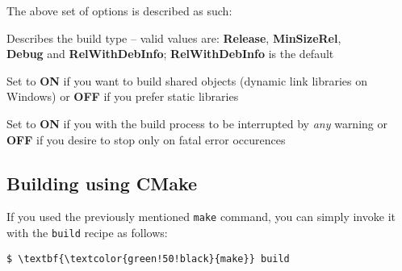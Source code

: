 The above set of options is described as such:
\begin{description}[style=nextline]
    \item[\texttt{-DCMAKE\textunderscore BUILD\textunderscore TYPE}] \hfill Describes the build type -- valid values are: \textbf{Release}, \textbf{MinSizeRel}, \\ \textbf{Debug} and \textbf{RelWithDebInfo}; \textbf{RelWithDebInfo} is the default
    \item[\texttt{-DBUILD\textunderscore SHARED\textunderscore LIBS}] \hfill Set to \textbf{ON} if you want to build shared objects (dynamic link libraries on Windows\texttrademark) or \textbf{OFF} if you prefer static libraries
    \item[\texttt{-DCLM\textunderscore WARNINGS\textunderscore AS\textunderscore ERRORS}] \hfill Set to \textbf{ON} if you with the build process to be interrupted by \emph{any} warning or \textbf{OFF} if you desire to stop only on fatal error occurences
\end{description}

\subsection*{Building using CMake}

If you used the previously mentioned \texttt{make} command, you can simply invoke it with the \texttt{build} recipe as follows:
\begin{Verbatim}[commandchars=\\\{\}]
    $ \textbf{\textcolor{green!50!black}{make}} build
\end{Verbatim}
